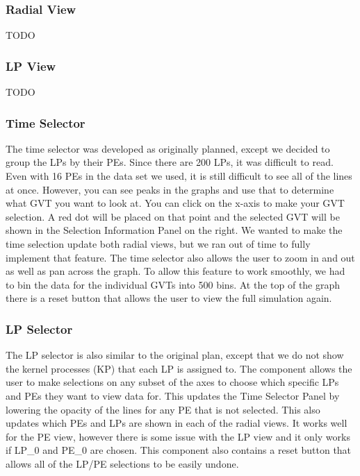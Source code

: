 \documentclass{acm_proc_article-sp}
\begin{document}
\subsubsection{Radial View}
\color{red} TODO  \color{black}

\subsubsection{LP View}
\color{red} TODO \color{black}

\subsubsection{Time Selector}
The time selector was developed as originally planned, except we decided to group the LPs by their PEs.  Since there are 200 LPs, it was difficult to read.  Even with 16 PEs in the data set we used, it is still difficult to see all of the lines at once.  However, you can see peaks in the graphs and use that to determine what GVT you want to look at.  You can click on the x-axis to make your GVT selection.  A red dot will be placed on that point and the selected GVT will be shown in the Selection Information Panel on the right.  We wanted to make the time selection update both radial views, but we ran out of time to fully implement that feature.  The time selector also allows the user to zoom in and out as well as pan across the graph.  To allow this feature to work smoothly, we had to bin the data for the individual GVTs into 500 bins.  At the top of the graph there is a reset button that allows the user to view the full simulation again.

\subsubsection{LP Selector}
The LP selector is also similar to the original plan, except that we do not show the kernel processes (KP) that each LP is assigned to.  The component allows the user to make selections on any subset of the axes to choose which specific LPs and PEs they want to view data for.  This updates the Time Selector Panel by lowering the opacity of the lines for any PE that is not selected.  This also updates which PEs and LPs are shown in each of the radial views.  It works well for the PE view, however there is some issue with the LP view and it only works if LP\_0 and PE\_0 are chosen.  This component also contains a reset button that allows all of the LP/PE selections to be easily undone.  
\end{document}
